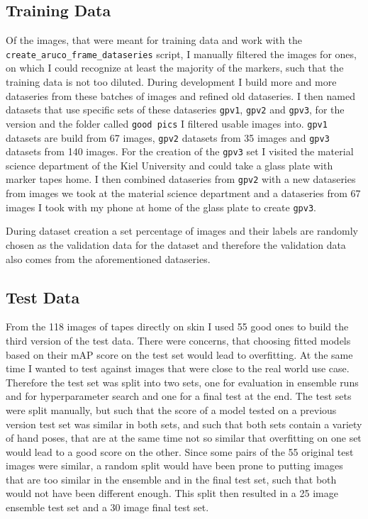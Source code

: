 \documentclass[10pt]{book}
\begin{document}
\subsection{Training Data}

Of the images, that were meant for training data and work with the \texttt{create\_aruco\_frame\_dataseries} script, I manually filtered the images for ones, on which I could recognize at least the majority of the markers, such that the training data is not too diluted. During development I build more and more dataseries from these batches of images and refined old dataseries. I then named datasets that use specific sets of these dataseries \texttt{gpv1}, \texttt{gpv2} and \texttt{gpv3}, for the version and the folder called \texttt{good pics} I filtered usable images into. \texttt{gpv1} datasets are build from 67 images, \texttt{gpv2} datasets from 35 images and \texttt{gpv3} datasets from 140 images. For the creation of the \texttt{gpv3} set I visited the material science department of the Kiel University and could take a glass plate with marker tapes home. I then combined dataseries from \texttt{gpv2} with a new dataseries from images we took at the material science department and a dataseries from 67 images I took with my phone at home of the glass plate to create \texttt{gpv3}.

During dataset creation a set percentage of images and their labels are randomly chosen as the validation data for the dataset and therefore the validation data also comes from the aforementioned dataseries.

\subsection{Test Data}

From the 118 images of tapes directly on skin I used 55 good ones to build the third version of the test data. There were concerns, that choosing fitted models based on their \ac{mAP} score on the test set would lead to overfitting. At the same time I wanted to test against images that were close to the real world use case. Therefore the test set was split into two sets, one for evaluation in ensemble runs and for hyperparameter search and one for a final test at the end. The test sets were split manually, but such that the score of a model tested on a previous version test set was similar in both sets, and such that both sets contain a variety of hand poses, that are at the same time not so similar that overfitting on one set would lead to a good score on the other. Since some pairs of the 55 original test images were similar, a random split would have been prone to putting images that are too similar in the ensemble and in the final test set, such that both would not have been different enough. This split then resulted in a 25 image ensemble test set and a 30 image final test set.
\end{document}
